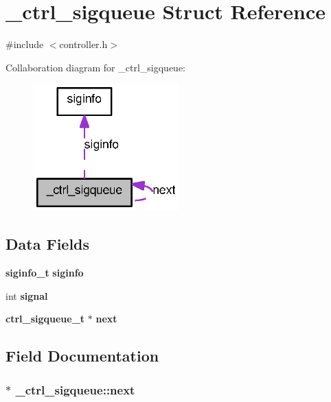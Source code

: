 \section{\_\-ctrl\_\-sigqueue Struct Reference}
\label{struct__ctrl__sigqueue}


{\ttfamily \#include $<$controller.h$>$}



Collaboration diagram for \_\-ctrl\_\-sigqueue:
\nopagebreak
\begin{figure}[H]
\begin{center}
\leavevmode
\includegraphics[width=159pt]{struct__ctrl__sigqueue__coll__graph}
\end{center}
\end{figure}
\subsection*{Data Fields}
\begin{DoxyCompactItemize}
\item 
{\bf siginfo\_\-t} {\bf siginfo}
\item 
int {\bf signal}
\item 
{\bf ctrl\_\-sigqueue\_\-t} $\ast$ {\bf next}
\end{DoxyCompactItemize}


\subsection{Field Documentation}
\subsubsection[{next}]{ $\ast$ {\bf \_\-ctrl\_\-sigqueue::next}}\label{struct__ctrl__sigqueue_a5acec139c3b85b1e6b6c6118ec7f1965}

